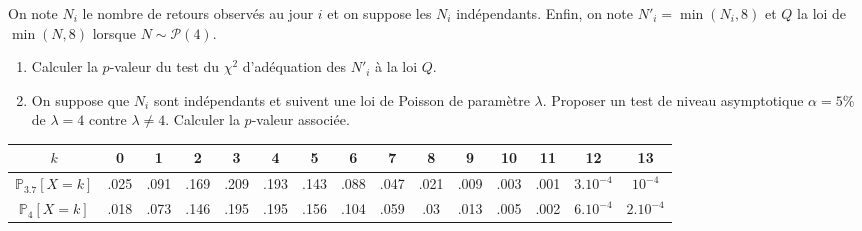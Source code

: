 \documentclass[a4paper,11pt,fleqn]{article}
\newcommand{\1}{\ensuremath{\mathbbm{1}}}
\newcommand{\p}{\ensuremath{\mathbb{P}}}
\begin{document}
On note $N_{i}$ le nombre de retours observ\'es au jour $i$ et on suppose les $N_{i}$ ind\'ependants. Enfin, on note $N'_{i}=\min(N_{i},8)$ et $Q$ la loi de $\min(N,8)$ lorsque $N\sim\mathcal{P}(4)$.
\begin{enumerate}
\item Calculer la $p$-valeur du test du $\chi^2$ d'ad\'equation des $N'_{i}$ \`a la loi
$Q$. 
\item On suppose que 
$N_{i}$ sont ind\'ependants et suivent une loi de Poisson de param\`etre $\lambda$. Proposer un test de niveau asymptotique  $\alpha=5\%$ de $\lambda=4$ contre $\lambda\neq 4$. Calculer la $p$-valeur associ\'ee.
\end{enumerate}
\bigskip


\bigskip

\hspace{-1.5cm}\begin{small}
\begin{tabular}{|c|c|c|c|c|c|c|c|c|c|c|c|c|c|c|}
\hline
$k$&0&1&2&3&4&5&6&7&8&9&10&11&12&13\\ \hline
$\p_{3.7}[X=k]$&.025&.091&.169&.209&.193&.143&.088&.047&.021&
.009&.003&.001&$3.10^{-4}$&$10^{-4}$\\ \hline
$\p_{4}[X=k]$&.018&.073&.146&.195&.195&.156&.104&.059&.03&.013&.005&.002&$6.10^{-4}$&$2.10^{-4}$\\
\hline
\end{tabular}\end{small}
\end{document}
